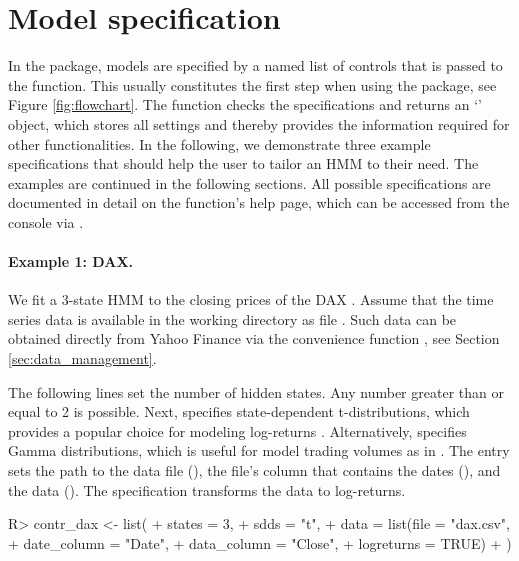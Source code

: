 \documentclass[article]{jss}
\newcommand{\class}[1]{`\code{#1}'}
\newcommand{\fct}[1]{\code{#1()}}
\begin{document}
\section{Model specification} \label{sec:model_specification} %

In the  package, models are specified by a named list of controls that is passed to the \fct{set\_controls} function. This usually constitutes the first step when using the package, see Figure \ref{fig:flowchart}. The function checks the specifications and returns an \class{fHMM\_controls} object, which stores all settings and thereby provides the information required for other functionalities. In the following, we demonstrate three example specifications that should help the user to tailor an HMM to their need. The examples are continued in the following sections. All possible specifications are documented in detail on the function's help page, which can be accessed from the  console via .

\paragraph{Example 1: DAX.} We fit a 3-state HMM to the closing prices of the DAX \citep{jan92}. Assume that the time series data is available in the working directory as file . Such data can be obtained directly from Yahoo Finance via the convenience function \fct{download\_data}, see Section \ref{sec:data_management}.

The following lines set the number  of hidden states. Any number greater than or equal to 2 is possible. Next,  specifies state-dependent t-distributions, which provides a popular choice for modeling log-returns \citep{pla08}. Alternatively,  specifies Gamma distributions, which is useful for model trading volumes as in \cite{ada20}. The  entry sets the path to the data file (), the file's column that contains the dates (), and the data (). The specification  transforms the data to log-returns.

%
\begin{Schunk}
\begin{Sinput}
R> contr_dax <- list(
+    states = 3,
+    sdds   = "t",
+    data   = list(file        = "dax.csv",
+                  date_column = "Date",
+                  data_column = "Close",
+                  logreturns  = TRUE)
+  )
\end{Sinput}
\end{Schunk}
%
\end{document}
